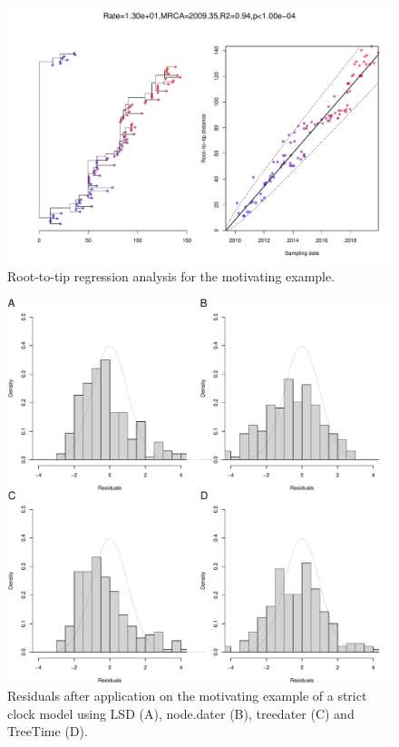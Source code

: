 \documentclass{article}
\begin{document}
\begin{figure}[t!]
\begin{center}
\includegraphics[width=15cm]{exampleS1.pdf}
\end{center}
\caption{Root-to-tip regression analysis for the motivating example.
\label{fig:exampleS1}}
\end{figure}

\begin{figure}[t!]
\begin{center}
\includegraphics[width=15cm]{exampleS2.pdf}
\end{center}
\caption{Residuals after application on the motivating example of a strict clock model using LSD (A), node.dater (B), treedater (C) and TreeTime (D).
\label{fig:exampleS2}}
\end{figure}
\end{document}
